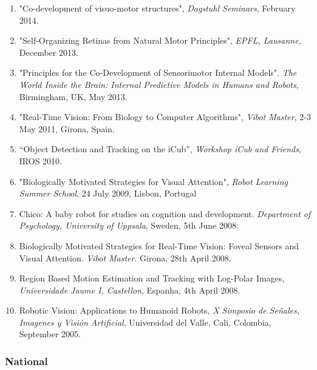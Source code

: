 \documentclass[
]{article}
\begin{document}
\begin{enumerate}
  2016, Lisbon, Portugal.
\item
  "Co-development of visuo-motor structures", \emph{Dagstuhl Seminars},
  February 2014.
\item
  "Self-Organizing Retinas from Natural Motor Principles", \emph{EPFL,
  Lausanne}, December 2013.~
\item
  "Principles for the Co-Development of Sensorimotor Internal Models".
  \emph{The World Inside the Brain: Internal Predictive Models in Humans
  and Robots}, Birmingham, UK, May 2013.
\item
  "Real-Time Vision: From Biology to Computer Algorithms", \emph{Vibot
  Master}, 2-3 May 2011, Girona, Spain.
\item
  ``Object Detection and Tracking on the iCub'', \emph{Workshop iCub and
  Friends}, IROS 2010.
\item
  "Biologically Motivated Strategies for Visual Attention", \emph{Robot
  Learning Summer School}, 24 July 2009, Lisbon, Portugal
\item
  Chico: A baby robot for studies on cognition and development.
  \emph{Department of Psychology, University of Uppsala}, Sweden, 5th
  June 2008.
\item
  Biologically Motivated Strategies for Real-Time Vision: Foveal Sensors
  and Visual Attention. \emph{Vibot Master}. Girona, 28th April 2008.
\item
  Region Based Motion Estimation and Tracking with Log-Polar Images,
  \emph{Universidade Jaume I, Castellon}, Espanha, 4th April 2008.
\item
  Robotic Vision: Applications to Humanoid Robots, \emph{X Simposio de
  Señales, Imagenes y Visión Artificial}, Universidad del Valle, Cali,
  Colombia, September 2005.
\end{enumerate}

\subsubsection{National}\label{national}
\end{document}

